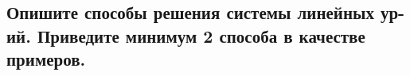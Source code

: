 

\subsection{Опишите способы решения системы линейных ур-ий. Приведите минимум 2 способа в качестве примеров.}


